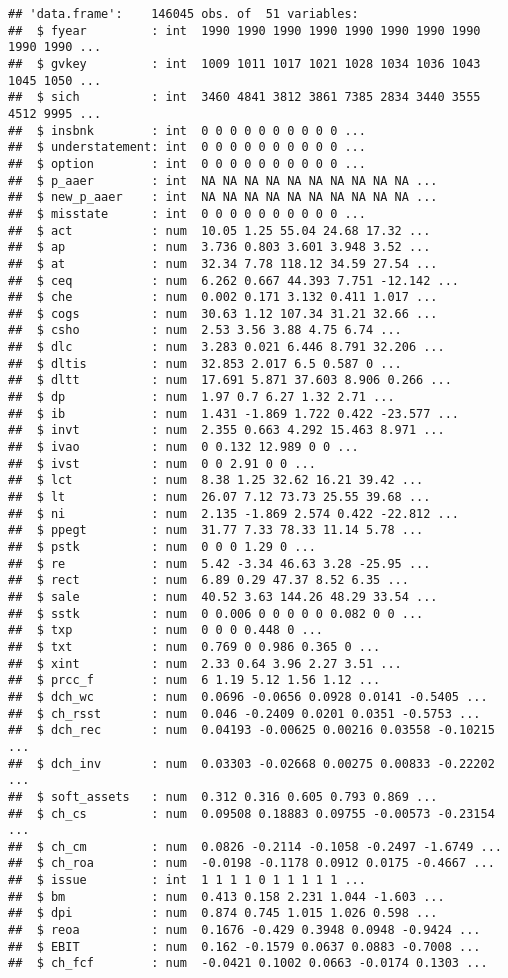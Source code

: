 \documentclass[
]{article}
\begin{document}
\begin{verbatim}
## 'data.frame':    146045 obs. of  51 variables:
##  $ fyear         : int  1990 1990 1990 1990 1990 1990 1990 1990 1990 1990 ...
##  $ gvkey         : int  1009 1011 1017 1021 1028 1034 1036 1043 1045 1050 ...
##  $ sich          : int  3460 4841 3812 3861 7385 2834 3440 3555 4512 9995 ...
##  $ insbnk        : int  0 0 0 0 0 0 0 0 0 0 ...
##  $ understatement: int  0 0 0 0 0 0 0 0 0 0 ...
##  $ option        : int  0 0 0 0 0 0 0 0 0 0 ...
##  $ p_aaer        : int  NA NA NA NA NA NA NA NA NA NA ...
##  $ new_p_aaer    : int  NA NA NA NA NA NA NA NA NA NA ...
##  $ misstate      : int  0 0 0 0 0 0 0 0 0 0 ...
##  $ act           : num  10.05 1.25 55.04 24.68 17.32 ...
##  $ ap            : num  3.736 0.803 3.601 3.948 3.52 ...
##  $ at            : num  32.34 7.78 118.12 34.59 27.54 ...
##  $ ceq           : num  6.262 0.667 44.393 7.751 -12.142 ...
##  $ che           : num  0.002 0.171 3.132 0.411 1.017 ...
##  $ cogs          : num  30.63 1.12 107.34 31.21 32.66 ...
##  $ csho          : num  2.53 3.56 3.88 4.75 6.74 ...
##  $ dlc           : num  3.283 0.021 6.446 8.791 32.206 ...
##  $ dltis         : num  32.853 2.017 6.5 0.587 0 ...
##  $ dltt          : num  17.691 5.871 37.603 8.906 0.266 ...
##  $ dp            : num  1.97 0.7 6.27 1.32 2.71 ...
##  $ ib            : num  1.431 -1.869 1.722 0.422 -23.577 ...
##  $ invt          : num  2.355 0.663 4.292 15.463 8.971 ...
##  $ ivao          : num  0 0.132 12.989 0 0 ...
##  $ ivst          : num  0 0 2.91 0 0 ...
##  $ lct           : num  8.38 1.25 32.62 16.21 39.42 ...
##  $ lt            : num  26.07 7.12 73.73 25.55 39.68 ...
##  $ ni            : num  2.135 -1.869 2.574 0.422 -22.812 ...
##  $ ppegt         : num  31.77 7.33 78.33 11.14 5.78 ...
##  $ pstk          : num  0 0 0 1.29 0 ...
##  $ re            : num  5.42 -3.34 46.63 3.28 -25.95 ...
##  $ rect          : num  6.89 0.29 47.37 8.52 6.35 ...
##  $ sale          : num  40.52 3.63 144.26 48.29 33.54 ...
##  $ sstk          : num  0 0.006 0 0 0 0 0 0.082 0 0 ...
##  $ txp           : num  0 0 0 0.448 0 ...
##  $ txt           : num  0.769 0 0.986 0.365 0 ...
##  $ xint          : num  2.33 0.64 3.96 2.27 3.51 ...
##  $ prcc_f        : num  6 1.19 5.12 1.56 1.12 ...
##  $ dch_wc        : num  0.0696 -0.0656 0.0928 0.0141 -0.5405 ...
##  $ ch_rsst       : num  0.046 -0.2409 0.0201 0.0351 -0.5753 ...
##  $ dch_rec       : num  0.04193 -0.00625 0.00216 0.03558 -0.10215 ...
##  $ dch_inv       : num  0.03303 -0.02668 0.00275 0.00833 -0.22202 ...
##  $ soft_assets   : num  0.312 0.316 0.605 0.793 0.869 ...
##  $ ch_cs         : num  0.09508 0.18883 0.09755 -0.00573 -0.23154 ...
##  $ ch_cm         : num  0.0826 -0.2114 -0.1058 -0.2497 -1.6749 ...
##  $ ch_roa        : num  -0.0198 -0.1178 0.0912 0.0175 -0.4667 ...
##  $ issue         : int  1 1 1 1 0 1 1 1 1 1 ...
##  $ bm            : num  0.413 0.158 2.231 1.044 -1.603 ...
##  $ dpi           : num  0.874 0.745 1.015 1.026 0.598 ...
##  $ reoa          : num  0.1676 -0.429 0.3948 0.0948 -0.9424 ...
##  $ EBIT          : num  0.162 -0.1579 0.0637 0.0883 -0.7008 ...
##  $ ch_fcf        : num  -0.0421 0.1002 0.0663 -0.0174 0.1303 ...
\end{verbatim}
\end{document}
